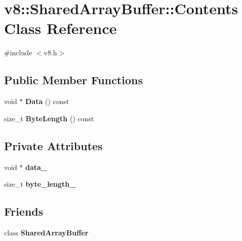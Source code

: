 \hypertarget{classv8_1_1_shared_array_buffer_1_1_contents}{}\section{v8\+:\+:Shared\+Array\+Buffer\+:\+:Contents Class Reference}
\label{classv8_1_1_shared_array_buffer_1_1_contents}


{\ttfamily \#include $<$v8.\+h$>$}

\subsection*{Public Member Functions}
\begin{DoxyCompactItemize}
\item 
void $\ast$ {\bfseries Data} () const \hypertarget{classv8_1_1_shared_array_buffer_1_1_contents_a7e25a8f041d968fb7af4c4ae72dd2dc7}{}\label{classv8_1_1_shared_array_buffer_1_1_contents_a7e25a8f041d968fb7af4c4ae72dd2dc7}

\item 
size\+\_\+t {\bfseries Byte\+Length} () const \hypertarget{classv8_1_1_shared_array_buffer_1_1_contents_a68fb3080f3304278ec47c2cfddfec0ae}{}\label{classv8_1_1_shared_array_buffer_1_1_contents_a68fb3080f3304278ec47c2cfddfec0ae}

\end{DoxyCompactItemize}
\subsection*{Private Attributes}
\begin{DoxyCompactItemize}
\item 
void $\ast$ {\bfseries data\+\_\+}\hypertarget{classv8_1_1_shared_array_buffer_1_1_contents_a28e46bb2a558606f7b6bde08cf98c5b3}{}\label{classv8_1_1_shared_array_buffer_1_1_contents_a28e46bb2a558606f7b6bde08cf98c5b3}

\item 
size\+\_\+t {\bfseries byte\+\_\+length\+\_\+}\hypertarget{classv8_1_1_shared_array_buffer_1_1_contents_a270e00df31c57697fe250a8535e67f43}{}\label{classv8_1_1_shared_array_buffer_1_1_contents_a270e00df31c57697fe250a8535e67f43}

\end{DoxyCompactItemize}
\subsection*{Friends}
\begin{DoxyCompactItemize}
\item 
class {\bfseries Shared\+Array\+Buffer}\hypertarget{classv8_1_1_shared_array_buffer_1_1_contents_a35ac2a80dda42f728b7b1dfc4c3cc040}{}\label{classv8_1_1_shared_array_buffer_1_1_contents_a35ac2a80dda42f728b7b1dfc4c3cc040}

\end{DoxyCompactItemize}


